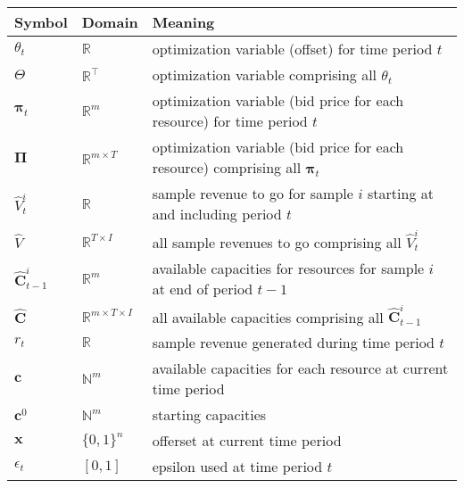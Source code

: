 \noindent\begin{minipage}{\linewidth}
	{\small
	\begin{tabular}{lll}
		\toprule
		Symbol & Domain & Meaning\\
		\midrule
		$\theta_t$ & $\mathbb{R}$ & optimization variable (offset) for time period $t$\\
		$\Theta$ & $\mathbb{R}^\intercal$ & optimization variable comprising all $\theta_t$\\
		$\boldsymbol{\pi}_t$ & $\mathbb{R}^m$ & optimization variable (bid price for each resource) for time period $t$\\
		$\boldsymbol{\Pi}$ & $\mathbb{R}^{m \times T }$ & optimization variable (bid price for each resource) comprising all $\boldsymbol{\pi}_t$\\
		$\hat{V}^i_t $ & $\mathbb{R}$ & sample revenue to go for sample $i$ starting at and including period $t$\\
		$\hat{V}$ &  $\mathbb{R}^{T \times I}$ &all sample revenues to go comprising all $\hat{V}^i_t $ \\
		$\boldsymbol{\hat{C}}^i_{t-1}$ & $\mathbb{R}^m$ & available capacities for resources for sample $i$ at end of period $t-1$\\
		$\boldsymbol{\hat{C}}$ & $\mathbb{R}^{m \times T \times I}$ & all available capacities comprising all $\boldsymbol{\hat{C}}^i_{t-1}$\\
		$r_t$ & $\mathbb{R}$ & sample revenue generated during time period $t$\\
		$\boldsymbol{c}$ & $\mathbb{N}^m$ & available capacities for each resource at current time period\\
		$\boldsymbol{c}^0$ & $\mathbb{N}^m$ & starting capacities\\
		$\boldsymbol{x}$ & $\{0,1\}^n$ & offerset at current time period\\
		$\epsilon_t$ & $[0,1]$ & epsilon used at time period $t$\\
		\bottomrule
	\end{tabular}
	}
	

\end{minipage}
